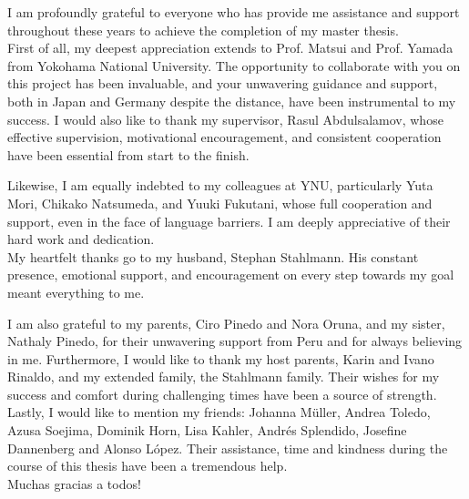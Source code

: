 \begin{acknowledgements}
\addchaptertocentry{\acknowledgementname} %
I am profoundly grateful to everyone who has provide me assistance and support 
throughout these years to achieve the completion of my master thesis.\\

First of all, my deepest appreciation extends to Prof. Matsui and Prof. 
Yamada from Yokohama National University. The opportunity to collaborate with you on this project has 
been invaluable, and your unwavering guidance and support, both in Japan and Germany despite the 
distance, have been instrumental to my success.
I would also like to thank my supervisor, Rasul Abdulsalamov, whose effective supervision,
motivational encouragement, and consistent cooperation have been essential from start to the finish.

Likewise, I am equally indebted to my colleagues at YNU, particularly Yuta Mori, Chikako Natsumeda, and Yuuki Fukutani, 
whose full cooperation and support, even in the face of language barriers. I am deeply appreciative of their hard work and dedication.\\

My heartfelt thanks go to my husband, Stephan Stahlmann. His constant presence, emotional support, 
and encouragement on every step towards my goal meant everything to me.

I am also grateful to my parents, Ciro Pinedo and Nora Oruna, and my sister, Nathaly Pinedo, 
for their unwavering support from Peru and for always believing in me. 
Furthermore, I would like to thank my host parents, Karin and Ivano Rinaldo, and my 
extended family, the Stahlmann family. Their wishes for my success and comfort during challenging times have been
a source of strength.\\

Lastly, I would like to mention my friends: Johanna Müller, Andrea Toledo, Azusa Soejima, Dominik Horn,
Lisa Kahler, Andrés Splendido, Josefine Dannenberg and Alonso López.
Their assistance, time and kindness during the course of this
thesis have been a tremendous help.\\

Muchas gracias a todos!

\end{acknowledgements}
